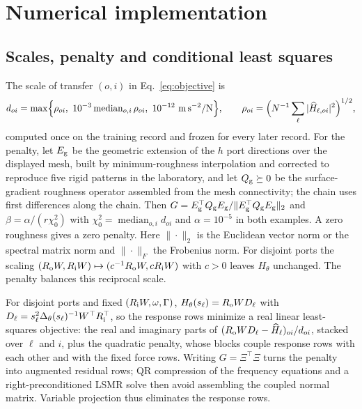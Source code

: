 \section{Numerical implementation}\label{sec:numerics}
\subsection{Scales, penalty and conditional least squares}\label{sec:fit-details}
The scale of transfer $(o,i)$ in Eq.~\eqref{eq:objective} is
\[
 d_{oi}=\max\Bigl\{\rho_{oi},\ 10^{-3}\operatorname{median}_{o,i}\rho_{oi},\
 10^{-12}\ \mathrm{m\,s^{-2}/N}\Bigr\},\qquad
 \rho_{oi}=\Bigl(N^{-1}\sum_{\ell}|\widehat H_{\ell,oi}|^{2}\Bigr)^{1/2},
\]
computed once on the training record and frozen for every later record.
For the penalty, let $E_{\rm g}$ be the geometric extension of the $h$ port
directions over the displayed mesh, built by minimum-roughness interpolation
and corrected to reproduce five rigid patterns in the laboratory, and
let $Q_{\rm g}\succeq0$ be the surface-gradient roughness operator assembled
from the mesh connectivity; the chain uses first differences along the chain.
Then $G=E_{\rm g}^{\top}Q_{\rm g}E_{\rm g}/\|E_{\rm g}^{\top}Q_{\rm g}E_{\rm g}\|_2$
and $\beta=\alpha/(r\chi_0^{2})$ with $\chi_0^{2}=\operatorname{median}_{o,i}d_{oi}$
and $\alpha=10^{-5}$ in both examples. A zero roughness gives a zero penalty.
Here $\|\cdot\|_2$ is the Euclidean vector norm or the spectral matrix norm
and $\|\cdot\|_F$ the Frobenius norm.
For disjoint ports the scaling
$(R_{\rm o}W,R_{\rm i}W)\mapsto(c^{-1}R_{\rm o}W,cR_{\rm i}W)$ with $c>0$
leaves $H_\theta$ unchanged. The penalty balances this reciprocal scale.

For disjoint ports and fixed $(R_{\rm i}W,\omega,\Gamma)$, $H_\theta(s_\ell)=R_{\rm o}WD_\ell$ with
$D_\ell=s_\ell^{2}\Delta_\theta(s_\ell)^{-1}W^{\top}R_{\rm i}^{\top}$, so the response
rows minimize a real linear least-squares objective: the real and imaginary
parts of $(R_{\rm o}WD_\ell-\widehat H_\ell)_{oi}/d_{oi}$, stacked over $\ell$ and $i$,
plus the quadratic penalty, whose blocks couple response rows with each other
and with the fixed force rows. Writing $G=\Xi^{\top}\Xi$ turns the penalty
into augmented residual rows; QR compression of the frequency equations and a
right-preconditioned LSMR solve then avoid assembling the coupled normal matrix.
Variable projection \citep{golub2003,oleary2013} thus eliminates the response
rows.


